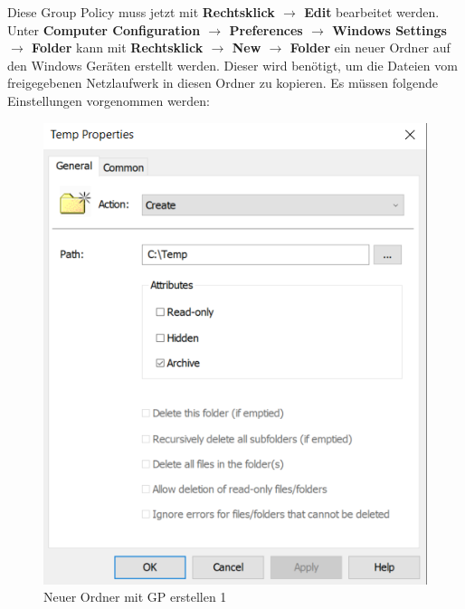 Diese Group Policy muss jetzt mit \textbf{Rechtsklick $\rightarrow$ Edit} bearbeitet werden.
Unter \textbf{Computer Configuration $\rightarrow$ Preferences $\rightarrow$ Windows Settings $\rightarrow$ Folder} kann mit \textbf{Rechtsklick $\rightarrow$ New $\rightarrow$ Folder} ein neuer Ordner auf den Windows Geräten erstellt werden.
Dieser wird benötigt, um die Dateien vom freigegebenen Netzlaufwerk in diesen Ordner zu kopieren.
Es müssen folgende Einstellungen vorgenommen werden:\\
\begin{minipage}{0.5\linewidth}
    \begin{figure}[H]
        \centering
        \includegraphics[width=0.7\linewidth]{../img/sysmon/new-folder-1.png}
        \caption{Neuer Ordner mit GP erstellen 1}
    \end{figure}
\end{minipage}

